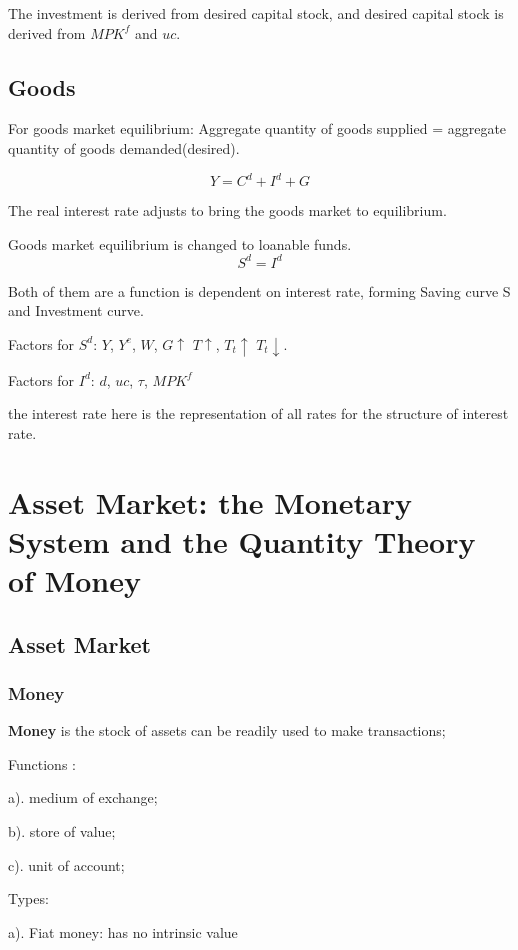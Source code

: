 \documentclass[10pt, a4paper]{article}
\begin{document}
                The investment is derived from desired capital stock, and desired capital stock is derived from $MPK^f$ and $uc$.  
        \subsection{Goods}
            For goods market equilibrium: Aggregate quantity of goods supplied = aggregate quantity of goods demanded(desired).
            
            $$Y = C^d + I^d + G$$

            The real interest rate adjusts to bring the goods market to equilibrium.


            Goods market equilibrium is changed to loanable funds. 
            $$S^d = I^d$$

            Both of them are a function is dependent on interest rate, forming Saving curve S and Investment curve. 

            Factors for $S^d$: $Y$, $Y^e$, $W$, $G \uparrow$ $T \uparrow$, $T_t \uparrow$ $T_t \downarrow$.

            Factors for $I^d$: $d$, $uc$, $\tau$, $MPK^f$

            the interest rate here is the representation of all rates for the structure of interest rate. 

    \section{Asset Market: the Monetary System and the Quantity Theory of Money}
        \subsection{Asset Market}
            \subsubsection{Money}
                \textbf{Money} is the stock of assets can be readily used to make transactions; 
                
                Functions : 

                a). medium of exchange; 
                
                b). store of value; 
                
                c). unit of account; 

                Types: 

                a). Fiat money: has no intrinsic value 
\end{document}
